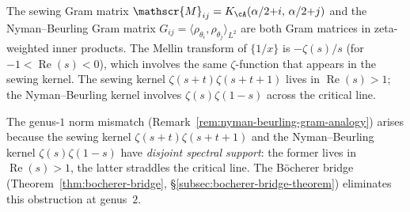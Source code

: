 \begin{remark}%
\label{rem:nyman-beurling-gram-analogy}%
%
The sewing Gram matrix $\mathscr{M}_{ij} =
K_\cA(\alpha/2{+}i,\,\alpha/2{+}j)$ and the Nyman--Beurling
Gram matrix $G_{ij} = \langle\rho_{\theta_i},\rho_{\theta_j}
\rangle_{L^2}$ are both Gram matrices in zeta-weighted inner
products. The Mellin transform of $\{1/x\}$ is $-\zeta(s)/s$
(for $-1 < \operatorname{Re}(s) < 0$), which involves the
same $\zeta$-function that appears in the sewing kernel.
The sewing kernel $\zeta(s{+}t)\zeta(s{+}t{+}1)$ lives in
$\operatorname{Re}(s) > 1$; the Nyman--Beurling kernel
involves $\zeta(s)\zeta(1{-}s)$ across the critical line.
\end{remark}

\begin{remark}%
\label{rem:genus2-beurling-kernel}%
%
%
The genus-$1$ norm mismatch
(Remark~\ref{rem:nyman-beurling-gram-analogy})
arises because the sewing kernel
$\zeta(s{+}t)\zeta(s{+}t{+}1)$ and the Nyman--Beurling
kernel $\zeta(s)\zeta(1{-}s)$ have \emph{disjoint spectral
support}: the former lives in $\operatorname{Re}(s) > 1$,
the latter straddles the critical line.
The B\"ocherer bridge
(Theorem~\ref{thm:bocherer-bridge},
\S\ref{subsec:bocherer-bridge-theorem})
eliminates this obstruction at genus~$2$.


\end{remark}
